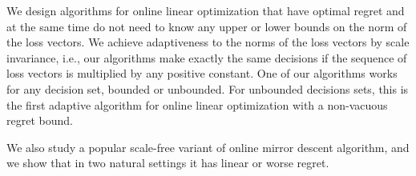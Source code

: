 We design algorithms for online linear optimization that have optimal regret
and at the same time do not need to know any upper or lower bounds on the norm
of the loss vectors.  We achieve adaptiveness to the norms of the loss vectors
by scale invariance, i.e., our algorithms make exactly the same decisions if
the sequence of loss vectors is multiplied by any positive constant.  One of
our algorithms works for any decision set, bounded or unbounded.  For unbounded
decisions sets, this is the first adaptive algorithm for online linear
optimization with a non-vacuous regret bound.

We also study a popular scale-free variant of online mirror descent algorithm,
and we show that in two natural settings it has linear or worse regret.
